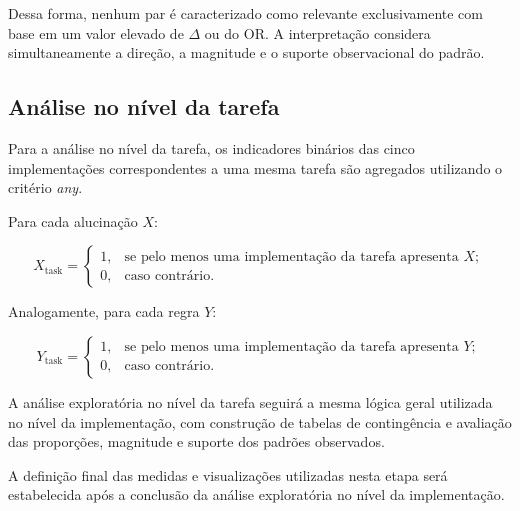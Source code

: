 Dessa forma, nenhum par é caracterizado como relevante exclusivamente com base em um valor elevado de $\Delta$ ou do OR. A interpretação considera simultaneamente a direção, a magnitude e o suporte observacional do padrão.

\subsection{Análise no nível da tarefa}

Para a análise no nível da tarefa, os indicadores binários das cinco implementações correspondentes a uma mesma tarefa são agregados utilizando o critério \textit{any}.

Para cada alucinação $X$:

\[
X_{\text{task}}=
\begin{cases}
1, & \text{se pelo menos uma implementação da tarefa apresenta }X;\\
0, & \text{caso contrário.}
\end{cases}
\]

Analogamente, para cada regra $Y$:

\[
Y_{\text{task}}=
\begin{cases}
1, & \text{se pelo menos uma implementação da tarefa apresenta }Y;\\
0, & \text{caso contrário.}
\end{cases}
\]

A análise exploratória no nível da tarefa seguirá a mesma lógica geral utilizada no nível da implementação, com construção de tabelas de contingência e avaliação das proporções, magnitude e suporte dos padrões observados.

A definição final das medidas e visualizações utilizadas nesta etapa será estabelecida após a conclusão da análise exploratória no nível da implementação.